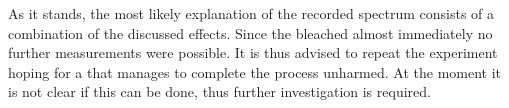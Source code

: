 \begin{figure}[htbp]
\begin{subfigure}[t]{ 0.69\linewidth}
						\caption{}
						\label{subfig::dipole_damaged_antenna_spectrum}
					\end{subfigure}
					\caption{}
					\label{fig::dipole_damaged_antenna}
				\end{figure}
				As it stands, the most likely explanation of the recorded spectrum consists of a combination of the discussed effects. Since the \nd bleached almost immediately no further measurements were possible. It is thus advised to repeat the experiment hoping for a \nd that manages to complete the \pp process unharmed. At the moment it is not clear if this can be done, thus further investigation is required.


